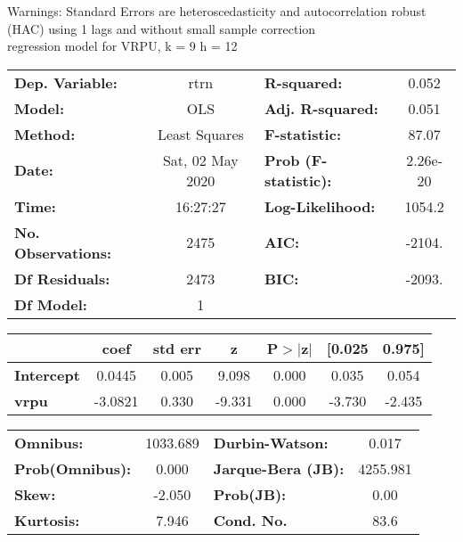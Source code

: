 Warnings: \newline
 [1] Standard Errors are heteroscedasticity and autocorrelation robust (HAC) using 1 lags and without small sample correction\\ 

regression model for VRPU, k = 9 h = 12\begin{center}
\begin{tabular}{lclc}
\toprule
\textbf{Dep. Variable:}    &       rtrn       & \textbf{  R-squared:         } &     0.052   \\
\textbf{Model:}            &       OLS        & \textbf{  Adj. R-squared:    } &     0.051   \\
\textbf{Method:}           &  Least Squares   & \textbf{  F-statistic:       } &     87.07   \\
\textbf{Date:}             & Sat, 02 May 2020 & \textbf{  Prob (F-statistic):} &  2.26e-20   \\
\textbf{Time:}             &     16:27:27     & \textbf{  Log-Likelihood:    } &    1054.2   \\
\textbf{No. Observations:} &        2475      & \textbf{  AIC:               } &    -2104.   \\
\textbf{Df Residuals:}     &        2473      & \textbf{  BIC:               } &    -2093.   \\
\textbf{Df Model:}         &           1      & \textbf{                     } &             \\
\bottomrule
\end{tabular}
\begin{tabular}{lcccccc}
                   & \textbf{coef} & \textbf{std err} & \textbf{z} & \textbf{P$> |$z$|$} & \textbf{[0.025} & \textbf{0.975]}  \\
\midrule
\textbf{Intercept} &       0.0445  &        0.005     &     9.098  &         0.000        &        0.035    &        0.054     \\
\textbf{vrpu}      &      -3.0821  &        0.330     &    -9.331  &         0.000        &       -3.730    &       -2.435     \\
\bottomrule
\end{tabular}
\begin{tabular}{lclc}
\textbf{Omnibus:}       & 1033.689 & \textbf{  Durbin-Watson:     } &    0.017  \\
\textbf{Prob(Omnibus):} &   0.000  & \textbf{  Jarque-Bera (JB):  } & 4255.981  \\
\textbf{Skew:}          &  -2.050  & \textbf{  Prob(JB):          } &     0.00  \\
\textbf{Kurtosis:}      &   7.946  & \textbf{  Cond. No.          } &     83.6  \\
\bottomrule
\end{tabular}
\end{center}

